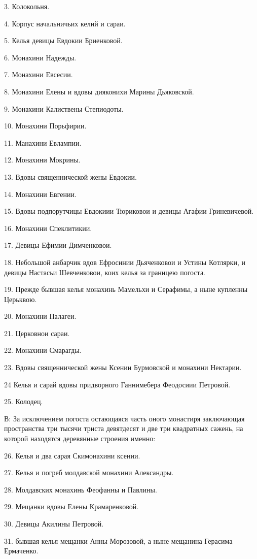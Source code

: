 3. Колокольня. 

4. Корпус начальничьих келий и сараи.

5. Келья девицы Евдокии Бриенковой.

6. Монахини Надежды.

7. Монахини Евсесии.

8. Монахини Елены и вдовы дияконихи Марины Дьяковской.

9. Монахини Калиствены Степиодоты.

10. Монахини Порьфирии.

11. Манахини Евлампии.

12. Монахини Мокрины.

13. Вдовы священнической жены Евдокии.

14. Монахини Евгении.

15. Вдовы подпорутчицы Евдокиии Тюриковои и девицы Агафии Гриневичевой.

16. Монахини Спеклитикии.

17. Девицы Ефимии Димченковои.

18. Небольшой анбарчик вдов Ефросинии Дьяченковои и Устины Котлярки, и девицы Настасьи Шевченковои, коих келья за границею погоста.

19. Прежде бывшая келья монахинь Мамельхи и Серафимы, а ныне купленны Церьквою.

20. Монахини Палагеи.

21. Церковнои сараи.

22. Монахини Смарагды.

23. Вдовы священнической жены Ксении Бурмовской и монахини Нектарии.

24 Келья и сарай вдовы придворного Ганнимебера Феодосиии Петровой.

25. Колодец.

В: За исключением погоста остающаяся часть оного монастиря заключающая пространства три тысячи триста девятдесят и две три квадратных сажень, на которой находятся деревянные строения именно:

26. Келья и два сарая Скимонахини ксении.

27. Келья и погреб молдавской монахини Александры.

28. Молдавских монахинь Феофанны и Павлины.

29. Мещанки вдовы Елены Крамаренковой.

30. Девицы Акилины Петровой.

31. бывшая келья мещанки Анны Морозовой, а ныне мещанина Герасима Ермаченко.


